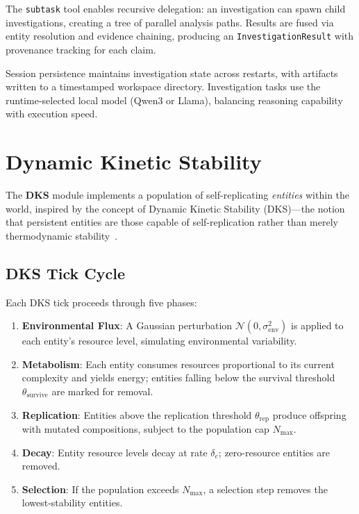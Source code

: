 \documentclass[11pt]{article}
\begin{document}
The \texttt{subtask} tool enables recursive delegation: an investigation can
spawn child investigations, creating a tree of parallel analysis paths. Results
are fused via entity resolution and evidence chaining, producing an
\texttt{InvestigationResult} with provenance tracking for each claim.

Session persistence maintains investigation state across restarts, with
artifacts written to a timestamped workspace directory. Investigation tasks use
the runtime-selected local model (Qwen3 or Llama), balancing reasoning
capability with execution speed.

\section{Dynamic Kinetic Stability}
\nopagebreak[4]
\label{sec:dks}

The \textbf{DKS} module implements a population of self-replicating
\emph{entities} within the world, inspired by the concept of Dynamic Kinetic
Stability (DKS)---the notion that persistent entities are those capable of
self-replication rather than merely thermodynamic stability~\cite{pross2012}.

\subsection{DKS Tick Cycle}

Each DKS tick proceeds through five phases:

\begin{enumerate}[noitemsep,topsep=4pt]
  \item \textbf{Environmental Flux}: A Gaussian perturbation $\mathcal{N}(0,
        \sigma_{\text{env}}^2)$ is applied to each entity's resource level,
        simulating environmental variability.
  \item \textbf{Metabolism}: Each entity consumes resources proportional to its
        current complexity and yields energy; entities falling below the survival
        threshold $\theta_{\text{survive}}$ are marked for removal.
  \item \textbf{Replication}: Entities above the replication threshold
        $\theta_{\text{rep}}$ produce offspring with mutated compositions, subject
        to the population cap $N_{\text{max}}$.
  \item \textbf{Decay}: Entity resource levels decay at rate $\delta_e$;
        zero-resource entities are removed.
  \item \textbf{Selection}: If the population exceeds $N_{\text{max}}$, a
        selection step removes the lowest-stability entities.
\end{enumerate}
\end{document}
